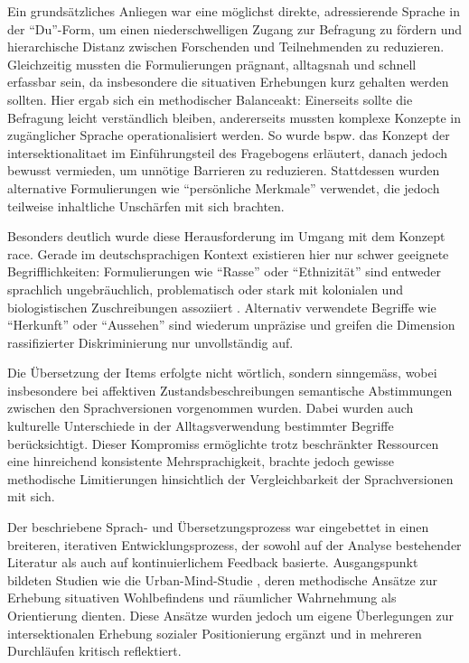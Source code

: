 Ein grundsätzliches Anliegen war eine möglichst direkte, adressierende Sprache in der \enquote{Du}-Form, um einen niederschwelligen Zugang zur Befragung zu fördern und hierarchische Distanz zwischen Forschenden und Teilnehmenden zu reduzieren. Gleichzeitig mussten die Formulierungen prägnant, alltagsnah und schnell erfassbar sein, da insbesondere die situativen Erhebungen kurz gehalten werden sollten. Hier ergab sich ein methodischer Balanceakt: Einerseits sollte die Befragung leicht verständlich bleiben, andererseits mussten komplexe Konzepte in zugänglicher Sprache operationalisiert werden. So wurde bspw. das Konzept der \gls{intersektionalitaet} im Einführungsteil des Fragebogens erläutert, danach jedoch bewusst vermieden, um unnötige Barrieren zu reduzieren. Stattdessen wurden alternative Formulierungen wie \enquote{persönliche Merkmale} verwendet, die jedoch teilweise inhaltliche Unschärfen mit sich brachten. 

Besonders deutlich wurde diese Herausforderung im Umgang mit dem Konzept \gls{race}. Gerade im deutschsprachigen Kontext existieren hier nur schwer geeignete Begrifflichkeiten: Formulierungen wie \enquote{Rasse} oder \enquote{Ethnizität} sind entweder sprachlich ungebräuchlich, problematisch oder stark mit kolonialen und biologistischen Zuschreibungen assoziiert \parencite[vgl.][]{roigIntersectionalityEuropeDepoliticized2018}. Alternativ verwendete Begriffe wie \enquote{Herkunft} oder \enquote{Aussehen} sind wiederum unpräzise und greifen die Dimension rassifizierter Diskriminierung nur unvollständig auf.

Die Übersetzung der Items erfolgte nicht wörtlich, sondern sinngemäss, wobei insbesondere bei affektiven Zustandsbeschreibungen semantische Abstimmungen zwischen den Sprachversionen vorgenommen wurden. Dabei wurden auch kulturelle Unterschiede in der Alltagsverwendung bestimmter Begriffe berücksichtigt. Dieser Kompromiss ermöglichte trotz beschränkter Ressourcen eine hinreichend konsistente Mehrsprachigkeit, brachte jedoch gewisse methodische Limitierungen hinsichtlich der Vergleichbarkeit der Sprachversionen mit sich.

Der beschriebene Sprach- und Übersetzungsprozess war eingebettet in einen breiteren, iterativen Entwicklungsprozess, der sowohl auf der Analyse bestehender Literatur als auch auf kontinuierlichem Feedback basierte. Ausgangspunkt bildeten Studien wie die Urban-Mind-Studie \parencite{bakolisUrbanMindUsing2018}, deren methodische Ansätze zur Erhebung situativen Wohlbefindens und räumlicher Wahrnehmung als Orientierung dienten. Diese Ansätze wurden jedoch um eigene Überlegungen zur intersektionalen Erhebung sozialer Positionierung ergänzt und in mehreren Durchläufen kritisch reflektiert.

